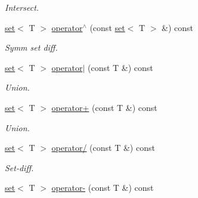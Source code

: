 \begin{DoxyCompactItemize}
\begin{DoxyCompactList}\small\item\em Intersect. \end{DoxyCompactList}\item 
\hyperlink{classmerlin_1_1set}{set}$<$ T $>$ \hyperlink{classmerlin_1_1set_a054f035d0051b753bc55b72067200dc5}{operator$^\wedge$} (const \hyperlink{classmerlin_1_1set}{set}$<$ T $>$ \&) const \hypertarget{classmerlin_1_1set_a054f035d0051b753bc55b72067200dc5}{}\label{classmerlin_1_1set_a054f035d0051b753bc55b72067200dc5}

\begin{DoxyCompactList}\small\item\em Symm set diff. \end{DoxyCompactList}\item 
\hyperlink{classmerlin_1_1set}{set}$<$ T $>$ \hyperlink{classmerlin_1_1set_a3c2bd97561ea5e7cd651cb4d6bcbf677}{operator$\vert$} (const T \&) const \hypertarget{classmerlin_1_1set_a3c2bd97561ea5e7cd651cb4d6bcbf677}{}\label{classmerlin_1_1set_a3c2bd97561ea5e7cd651cb4d6bcbf677}

\begin{DoxyCompactList}\small\item\em Union. \end{DoxyCompactList}\item 
\hyperlink{classmerlin_1_1set}{set}$<$ T $>$ \hyperlink{classmerlin_1_1set_a3da3e8798b664f7e746a6729e96a3536}{operator+} (const T \&) const \hypertarget{classmerlin_1_1set_a3da3e8798b664f7e746a6729e96a3536}{}\label{classmerlin_1_1set_a3da3e8798b664f7e746a6729e96a3536}

\begin{DoxyCompactList}\small\item\em Union. \end{DoxyCompactList}\item 
\hyperlink{classmerlin_1_1set}{set}$<$ T $>$ \hyperlink{classmerlin_1_1set_a24b9eb766ec4c25ded1309bcd1c39526}{operator/} (const T \&) const \hypertarget{classmerlin_1_1set_a24b9eb766ec4c25ded1309bcd1c39526}{}\label{classmerlin_1_1set_a24b9eb766ec4c25ded1309bcd1c39526}

\begin{DoxyCompactList}\small\item\em Set-\/diff. \end{DoxyCompactList}\item 
\hyperlink{classmerlin_1_1set}{set}$<$ T $>$ \hyperlink{classmerlin_1_1set_af97e3a5d5f7c4e8b3e9a19faef1f4ee2}{operator-\/} (const T \&) const \hypertarget{classmerlin_1_1set_af97e3a5d5f7c4e8b3e9a19faef1f4ee2}{}\label{classmerlin_1_1set_af97e3a5d5f7c4e8b3e9a19faef1f4ee2}


\end{DoxyCompactItemize}
